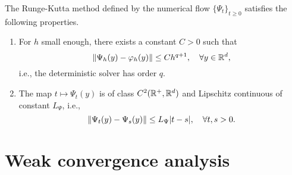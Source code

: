 \documentclass[final,onefignum,onetabnum]{siamonline171218}
\begin{document}
\begin{assumption}\label{as:PsiStrong} The Runge-Kutta method defined by the numerical flow $\{\Psi_t\}_{t\geq 0}$ satisfies the following properties.
	\begin{enumerate}
		\item\label{as:PsiStrong_Order} For $h$ small enough, there exists a constant $C > 0$ such that
		\begin{equation}
		\lVert\Psi_h(y) - \varphi_h(y)\rVert \leq Ch^{q+1}, \quad \forall y \in \mathbb{R}^d,
		\end{equation}
		i.e., the deterministic solver has order $q$.
		\item\label{as:PsiStrong_Time} The map $t \mapsto \Psi_t(y)$ is of class $C^2(\mathbb{R}^+, \mathbb{R}^d)$ and Lipschitz continuous of constant $L_\Psi$, i.e.,
		\begin{equation}\label{eq:LipschitzPsiT}
		\norm{\Psi_t(y) - \Psi_s(y)} \leq L_\Psi \abs{t - s}, \quad \forall t, s > 0.
		\end{equation}
	\end{enumerate}
\end{assumption}


\section{Weak convergence analysis}\label{sec:WeakOrder}
\end{document}
